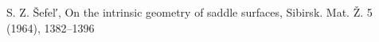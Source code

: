 \documentclass[a4paper,10pt]{amsart}
\begin{document}
\begin{thebibliography}{52}
 S. Z. \v{S}efel′, On the intrinsic geometry of saddle surfaces, Sibirsk. Mat. Ž. 5 (1964), 1382--1396



\end{thebibliography}
\end{document}
